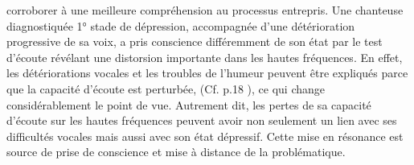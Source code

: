 corroborer à une 
meilleure  
compréhension au 
processus entrepris.
Une chanteuse diagnostiquée 1° stade de dépression, accompagnée d'une 
détérioration progressive de sa voix, a pris conscience différemment de son état 
par le test d'écoute révélant une distorsion 
importante dans les hautes fréquences. 
En effet, les détériorations vocales et les troubles de l'humeur peuvent être expliqués parce que la 
capacité d'écoute est perturbée, (Cf. p.18 \autocite{affectiveDisorders}), ce qui change 
considérablement le point de vue.
Autrement dit, les pertes de sa capacité d'écoute sur les hautes fréquences peuvent avoir non seulement 
un lien avec ses difficultés vocales mais aussi avec son état dépressif. Cette mise en résonance est 
source de prise de conscience et mise à distance de la problématique.


